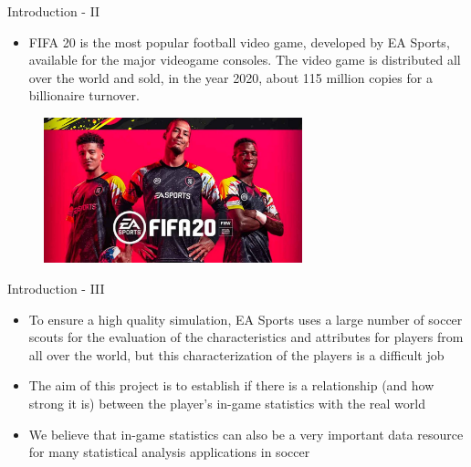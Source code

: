 \documentclass[aspectratio=169,xcolor=dvipsnames]{beamer}
\begin{document}
\begin{frame}{Introduction - II}
\begin{itemize}
\item FIFA 20 is the most popular football video game, developed by EA Sports, available for the major videogame consoles. The video game is distributed all over the world and sold, in the year 2020, about 115 million copies for a billionaire turnover.
\end{itemize}
\begin{figure}[H] 
\begin{center} 
  \includegraphics[width=7.5cm]{fifa20.jpg}\\ 
\end{center} 
\end{figure}
\end{frame}


\begin{frame}{Introduction - III}
\begin{itemize}
\item To ensure a high quality simulation, EA Sports uses a large number of soccer scouts for the evaluation of the characteristics and attributes for players from all over the world, but this characterization of the players is a difficult job

\item The aim of this project is to establish if there is a relationship (and how strong it is) between the player's in-game statistics with the real world


\item We believe that in-game statistics can also be a very important data resource for many statistical analysis applications in soccer
\end{itemize}
\end{frame}
\end{document}
